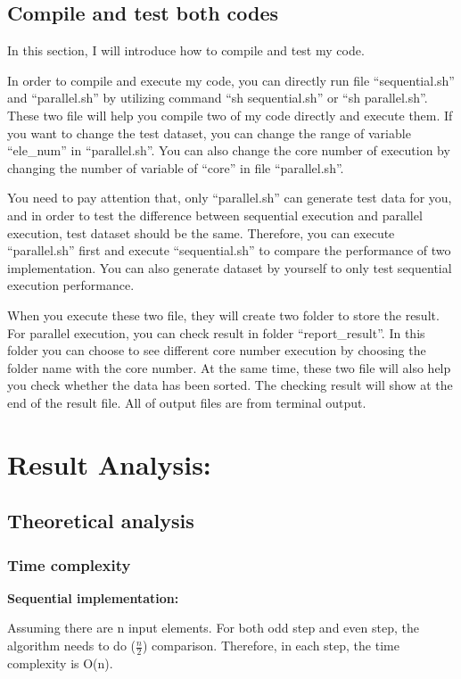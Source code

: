 \subsection{Compile and test both codes}

In this section, I will introduce how to compile and test my code. 

In order to compile and execute my code, you can directly run file “sequential.sh” and “parallel.sh” by utilizing command “sh sequential.sh” or “sh parallel.sh”. These two file will help you compile two of my code directly and execute them. If you want to change the test dataset, you can change the range of variable “ele\_num” in “parallel.sh”. You can also change the core number of execution by changing the number of variable of “core” in  file “parallel.sh”. 

You need to pay attention that, only “parallel.sh” can generate test data for you, and in order to test the difference between sequential execution and parallel execution, test dataset should be the same. Therefore, you can execute “parallel.sh” first and execute “sequential.sh” to compare the performance of two implementation. You can also generate dataset by yourself to only test sequential execution performance. 

When you execute these two file, they will create two folder to store the result. For parallel execution, you can check result in folder “report\_result”. In this folder you can choose to see different core number execution by choosing the folder name with the core number. At the same time, these two file will also help you check whether the data has been sorted. The checking result will show at the end of the result file. All of output files are from terminal output.

\section{Result Analysis:}

\subsection{Theoretical analysis}
\subsubsection{Time complexity}

\textbf{Sequential implementation:}

Assuming there are n input elements. For both odd step and even step, the algorithm needs to do ($\frac{n}{2}$) comparison. Therefore, in each step, the time complexity is O(n). 

